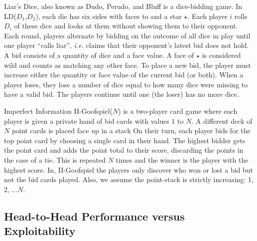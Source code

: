 \documentclass[letterpaper]{article}
\newcommand{\ie}{{\it i.e.}\xspace}
\begin{document}
Liar's Dice, also known as Dudo, Perudo, and Bluff is a dice-bidding game. 
In LD($D_1$,$D_2$), each die has six sides with faces  to  and a star $\star$. 
Each player $i$ rolls $D_i$ of these dice and looks at them without showing them to their opponent. 
Each round, players alternate by bidding on the outcome of all dice in play until one player ``calls liar'', 
\ie claims that their opponent's latest bid does not hold.
A bid consists of a quantity of dice and a face value.  
A face of $\star$ is considered wild and counts as matching any other face.
To place a new bid, the player must increase either the quantity or face value of the current 
bid (or both). When a player loses, they lose a number of dice equal to how many dice were missing 
to have a valid bid. The players continue until one (the loser) has no more dice.

Imperfect Information II-Goofspiel($N$) is a two-player card game where each player is
given a private hand of bid cards with values $1$ to $N$. A different
deck of $N$ point cards is placed face up in a stack 
On their turn, each player bids for the top point card by 
choosing a single card in their hand. 
The highest bidder gets the point card and adds the point total to their score, discarding
the points in the case of a tie. 
This is repeated $N$ times and the winner is the player with the highest score.
In, II-Goofspiel the players only discover who won or lost a bid but not the bid cards played.
Also, we assume the point-stack is strictly increasing: 1, 2, $\ldots N$.


\subsection{Head-to-Head Performance versus Exploitability} 
\end{document}
